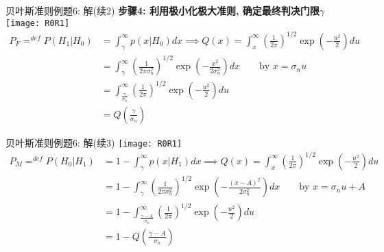 \begin{frame}[shrink]{贝叶斯准则例题6: 解(续2)}
\textbf{步骤4: 利用极小化极大准则, 确定最终判决门限$\gamma$}
\texttt{[image: R0R1]}
\begin{align*}
P_F\mathop{=}^{def}P(H_1|H_0)&=\int_{\gamma}^{\infty}p(x|H_0)dx\implies Q(x)=\int_{x}^{\infty}\left(\frac{1}{2\pi}\right)^{1/2}\exp\left(-\frac{u^2}{2}\right)du\\
&=\int_{\gamma}^{\infty}\left(\frac{1}{2\pi\sigma_n^2}\right)^{1/2}\exp\left(-\frac{x^2}{2\sigma_n^2}\right)dx\qquad \text{by } x=\sigma_nu\\
&=\int_{\frac{\gamma}{\sigma_n}}^{\infty}\left(\frac{1}{2\pi}\right)^{1/2}\exp\left(-\frac{u^2}{2}\right)du\\
&=Q\left(\frac{\gamma}{\sigma_n}\right)
\end{align*}
\end{frame}

\begin{frame}[shrink]{贝叶斯准则例题6: 解(续3)}
\texttt{[image: R0R1]}
\begin{align*}
P_M\mathop{=}^{def}P(H_0|H_1)&=1-\int_{\gamma}^{\infty}p(x|H_1)dx\implies Q(x)=\int_{x}^{\infty}\left(\frac{1}{2\pi}\right)^{1/2}\exp\left(-\frac{u^2}{2}\right)du\\
&=1-\int_{\gamma}^{\infty}\left(\frac{1}{2\pi\sigma_n^2}\right)^{1/2}\exp\left(-\frac{(x-A)^2}{2\sigma_n^2}\right)dx\qquad \text{by } x=\sigma_nu+A\\
&=1-\int_{\frac{\gamma-A}{\sigma_n}}^{\infty}\left(\frac{1}{2\pi}\right)^{1/2}\exp\left(-\frac{u^2}{2}\right)du\\
&=1-Q\left(\frac{\gamma-A}{\sigma_n}\right)
\end{align*}
\end{frame}

